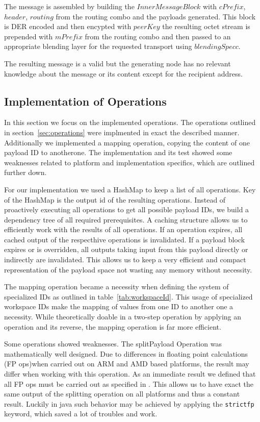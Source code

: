 The message is assembled by building the $InnerMessageBlock$ with $cPrefix$, $header$, $routing$ from the routing combo and the payloads generated. This block is DER encoded and then encypted with $peerKey$ the resulting octet stream is prepended with $mPrefix$ from the routing combo and then passed to an appropriate blending layer for the requested transport using $blendingSpecc$.

The resulting message is a valid \VortexMessage but the generating node has no relevant knowledge about the message or its content except for the recipient address.

\subsection{Implementation of Operations\label{sec:implOperations}}
In this section we focus on the implemented operations. The operations outlined in section~\ref{sec:operations} were implmented in exact the described manner. Additionally we implemented a mapping operation, copying the content of one payload ID to anotherone. The implementation and its test showed some weaknesses related to platform and implementation specifics, which are outlined further down.

For our implementation we used a HashMap to keep a list of all operations. Key of the HashMap is the output id of the resulting operations. Instead of proactively executing all operations to get all possible payload IDs, we build a dependency tree of all required prerequisites. A caching structure allows us to efficiently work with the results of all operations. If an operation expires, all cached output of the respecthive operations is invalidated. If a payload block expires or is overridden, all outputs taking input from this payload directly or indirectly are invalidated. This allows us to keep a very efficient and compact representation of the payload space not wasting any memory without necessity.

The mapping operation became a necessity when defining the system of specialized IDs as outlined in table~\ref{tab:workspaceId}. This usage of specialized workspace IDs make the mapping of values from one  ID to another one a necessity. While theoretically doable in a two-step operation by applying an operation and its reverse, the mapping operation is far more efficient.

Some operations showed weaknesses. The splitPayload Operation was mathematically well designed. Due to differences in floating point calculations (FP ops)when carried out on ARM and AMD based platforms, the result may differ when working with this operation. As an immediate result we defined that all FP ops must be carried out as specified in \cite{IEEE754}. This allows us to have exact the same output of the splitting operation on all platforms and thus a constant result. Luckily in java such behavior may be achieved by applying the \lstinline[columns=fixed,basicstyle=\normalsize]{strictfp} keyword, which saved a lot of troubles and work.

